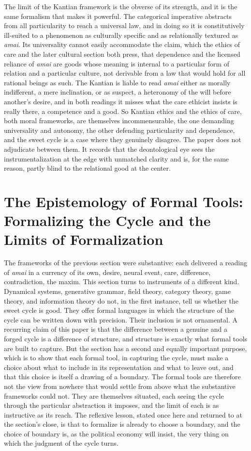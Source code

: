 The limit of the Kantian framework is the obverse of its strength, and it is the same formalism that makes it powerful. The categorical imperative abstracts from all particularity to reach a universal law, and in doing so it is constitutively ill-suited to a phenomenon as culturally specific and as relationally textured as \textit{amai}. Its universality cannot easily accommodate the claim, which the ethics of care and the later cultural section both press, that dependence and the licensed reliance of \textit{amai} are goods whose meaning is internal to a particular form of relation and a particular culture, not derivable from a law that would hold for all rational beings as such. The Kantian is liable to read \textit{amai} either as morally indifferent, a mere inclination, or as suspect, a heteronomy of the will before another's desire, and in both readings it misses what the care ethicist insists is really there, a competence and a good. So Kantian ethics and the ethics of care, both moral frameworks, are themselves incommensurable, the one demanding universality and autonomy, the other defending particularity and dependence, and the sweet cycle is a case where they genuinely disagree. The paper does not adjudicate between them. It records that the deontological eye sees the instrumentalization at the edge with unmatched clarity and is, for the same reason, partly blind to the relational good at the center.

\section{The Epistemology of Formal Tools: Formalizing the Cycle and the Limits of Formalization}

The frameworks of the previous section were substantive: each delivered a reading of \textit{amai} in a currency of its own, desire, neural event, care, difference, contradiction, the maxim. This section turns to instruments of a different kind. Dynamical systems, generative grammar, field theory, category theory, game theory, and information theory do not, in the first instance, tell us whether the sweet cycle is good. They offer formal languages in which the structure of the cycle can be written down with precision. Their inclusion is not ornamental. A recurring claim of this paper is that the difference between a genuine and a forged cycle is a difference of structure, and structure is exactly what formal tools are built to capture. But the section has a second and equally important purpose, which is to show that each formal tool, in capturing the cycle, must make a choice about what to include in its representation and what to leave out, and that this choice is itself a drawing of a boundary. The formal tools are therefore not the view from nowhere that would settle from above what the substantive frameworks could not. They are themselves situated, each seeing the cycle through the particular abstraction it imposes, and the limit of each is as instructive as its reach. The reflexive lesson, stated once here and returned to at the section's close, is that to formalize is already to choose a boundary, and the choice of boundary is, as the political economy will insist, the very thing on which the judgment of the cycle turns.

